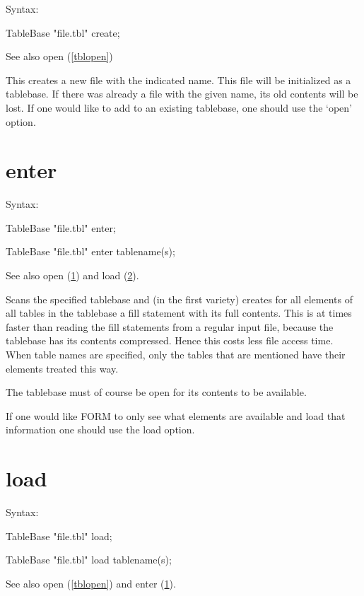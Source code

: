 \noindent Syntax:

TableBase "file.tbl" create;

\noindent See also open (\ref{tblopen})

\noindent This creates a new file with the 
indicated name. This file will be initialized as a tablebase. If there was 
already a file with the given name, its old contents will be lost. If one 
would like to add to an existing tablebase, one should use the 
`open' option.


\section{enter}
\label{tblenter}

\noindent Syntax:

TableBase "file.tbl" enter;

TableBase "file.tbl" enter tablename(s);

\noindent See also open (\ref{tblenter}) and load (\ref{tblload}).

\noindent Scans the specified tablebase and (in the first 
variety) creates for all elements of all tables in the tablebase a 
fill statement with its full contents. This is at times faster 
than reading the fill statements from a regular input 
file, because the tablebase has its contents 
compressed. 
Hence this costs less file access time. When table names are specified, 
only the tables that are mentioned have their elements treated this way.

\noindent The tablebase must of course be open for its contents to be 
available.

\noindent If one would like FORM to only see what elements are available 
and load that information one should use the load option.


\section{load}
\label{tblload}

\noindent Syntax:

TableBase "file.tbl" load;

TableBase "file.tbl" load tablename(s);

\noindent See also open (\ref{tblopen}) and enter (\ref{tblenter}).

